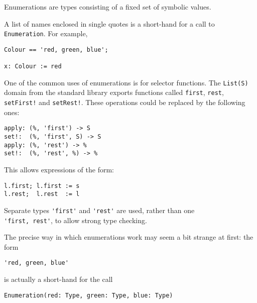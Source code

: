 %
%
Enumerations are types consisting of a fixed set of symbolic values.

A list of names enclosed in single quotes
is a short-hand for a call to \verb+Enumeration+.
For example,

\begin{small}
\begin{verbatim}
Colour == 'red, green, blue';

x: Colour := red
\end{verbatim}
\end{small}

One of the common uses of enumerations is for selector functions.
The \verb+List(S)+ domain from the standard \asharp{} library exports
functions called \verb+first+, \verb+rest+, \verb+setFirst!+ and \verb+setRest!+.
These operations could be replaced by the following ones:

\begin{small}%
\begin{verbatim}
apply: (%, 'first') -> S
set!:  (%, 'first', S) -> S
apply: (%, 'rest') -> %
set!:  (%, 'rest', %) -> %
\end{verbatim}
\end{small}%

This allows expressions of the form:

\begin{small}%
\begin{verbatim}
l.first; l.first := s
l.rest;  l.rest  := l
\end{verbatim}
\end{small}%

Separate types \verb"'first'" and \verb"'rest'" are used,
rather than one \\ \verb"'first, rest'", to allow strong type checking.

The precise way in which enumerations work may seem a bit strange at first:
the form 

\begin{small}
\begin{verbatim}
'red, green, blue'
\end{verbatim}
\end{small}%

is actually a short-hand for the call 

\begin{small}
\begin{verbatim}
Enumeration(red: Type, green: Type, blue: Type)
\end{verbatim}
\end{small}%


